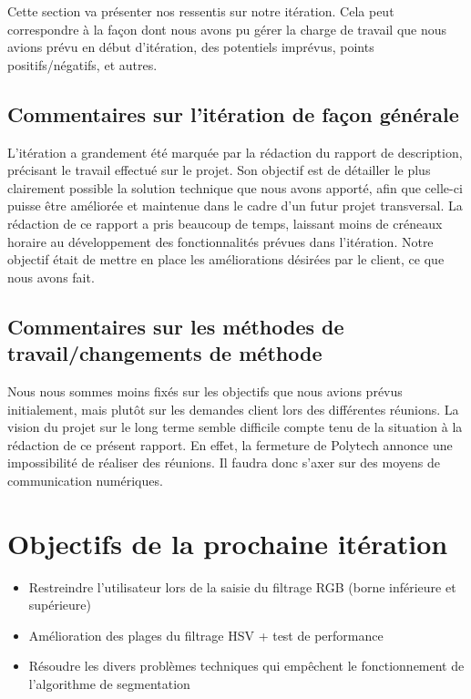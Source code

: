 \documentclass[12pt,titlepage,french]{article}
\begin{document}
Cette section va présenter nos ressentis sur notre itération. Cela peut correspondre à la façon dont nous avons pu gérer la charge de travail que nous avions prévu en début d'itération, des potentiels imprévus, points positifs/négatifs, et autres.

\subsection{Commentaires sur l'itération de façon générale}

L'itération a grandement été marquée par la rédaction du rapport de description, précisant le travail effectué sur le projet. Son objectif est de détailler le plus clairement possible la solution technique que nous avons apporté, afin que celle-ci puisse être améliorée et maintenue dans le cadre d'un futur projet transversal.
La rédaction de ce rapport a pris beaucoup de temps, laissant moins de créneaux horaire au développement des fonctionnalités prévues dans l'itération.
Notre objectif était de mettre en place les améliorations désirées par le client, ce que nous avons fait.

\subsection{Commentaires sur les méthodes de travail/changements de méthode}

Nous nous sommes moins fixés sur les objectifs que nous avions prévus initialement, mais plutôt sur les demandes client lors des différentes réunions.
La vision du projet sur le long terme semble difficile compte tenu de la situation à la rédaction de ce présent rapport. En effet, la fermeture de Polytech annonce une impossibilité de réaliser des réunions.
Il faudra donc s'axer sur des moyens de communication numériques.
\section{Objectifs de la prochaine itération}

\begin{itemize}
    \item Restreindre l'utilisateur lors de la saisie du filtrage RGB (borne inférieure et supérieure)
    \item Amélioration des plages du filtrage HSV + test de performance
    \item Résoudre les divers problèmes techniques qui empêchent le fonctionnement de l'algorithme de segmentation
\end{itemize}
\end{document}
